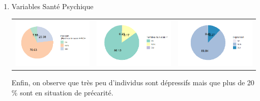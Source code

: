 \documentclass{book}
\begin{document}
\begin{enumerate}
\bigskip
\item Variables Santé Psychique
\begin{center}
\begin{tabular}{ccc}
\includegraphics[scale=.3]{pie_epice.png} &
\includegraphics[scale=.3]{barPlot_TS} &
\includegraphics[scale=.3]{pie_deptot}
\end{tabular}
\end{center}
Enfin, on observe que très peu d'individus sont dépressifs mais que plus de 20 $\%$ sont en situation de précarité.
\end{enumerate}
\end{document}
